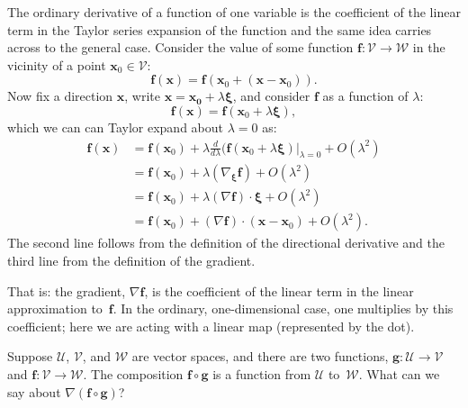 \documentclass{article}
\newcommand{\V}{\mathcal{V}}
\newcommand{\W}{\mathcal{W}}
\newcommand{\vv}[1]{\symbf{#1}}
\begin{document}
The ordinary derivative of a function of one variable is the
coefficient of the linear term in the Taylor series expansion of the
function and the same idea carries across to the general case.  Consider
the value of some function $\vv{f}\colon \V\to\W$ in the vicinity of a point
$\vv{x}_0\in\V$:
\begin{equation*}
  \vv{f}(\vv{x}) = \vv{f}(\vv{x}_0 + (\vv{x} - \vv{x}_0)). 
\end{equation*}
Now fix a direction $\vv{x}$, write $\vv{x} = \vv{x_0} + \lambda\vv{\xi}$,
and consider $\vv{f}$ as a function of $\lambda$:
\begin{equation*}
  \vv{f}(\vv{x}) = \vv{f}(\vv{x}_0 + \lambda \vv{\xi}),
\end{equation*}
which we can can Taylor expand about $\lambda=0$ as:
\begin{equation*}
  \begin{aligned}
    \vv{f}(\vv{x})
    &= \vv{f}(\vv{x}_0) + \lambda \frac{d}{d\lambda}(\vv{f}(\vv{x}_0 + \lambda
      \vv{\xi})\big|_{\lambda=0} + O(\lambda^2) \\
    &= \vv{f}(\vv{x}_0) + \lambda(\nabla_{\vv{\xi}} \vv{f}) + O(\lambda^2) \\
    &= \vv{f}(\vv{x}_0) + \lambda(\nabla \vv{f})\cdot\vv{\xi} + O(\lambda^2) \\
    &= \vv{f}(\vv{x}_0) + (\nabla \vv{f})\cdot(\vv{x}-\vv{x}_0) + O(\lambda^2).
  \end{aligned}
\end{equation*}
The second line follows from the definition of the directional derivative and the
third line from the definition of the gradient.

That is: the gradient, $\nabla\vv{f}$, is the coefficient of the linear
term in the linear approximation to~$\vv{f}$.  In the ordinary,
one-dimensional case, one multiplies by this coefficient; here we are
acting with a linear map (represented by the dot).

Suppose $\mathcal{U}$, $\V$, and $\W$ are vector spaces, and there are two
functions, $\vv{g}\colon \mathcal{U}\to\V$ and $\vv{f}\colon \V\to\W$.  The
composition $\vv{f} \circ \vv{g}$ is a function from $\mathcal{U}$
to~$\W$.  What can we say about $\nabla (\vv{f} \circ \vv{g})$?
\end{document}
